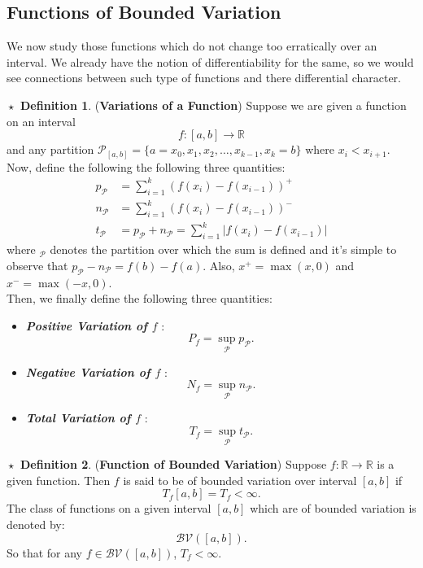 \documentclass{article}
\theoremstyle{definition}
\newtheorem{definition}{$\boxed{\star}$ Definition}
\theoremstyle{remark}
\theoremstyle{definition}
\theoremstyle{definition}
\theoremstyle{definition}
\newcommand{\abs}[1]{\left \vert #1\right \vert}
\newcommand{\R}{\mathbb{R}}
\newcommand{\bv}[1]{\mathcal{BV}\left (#1\right )}
\begin{document}
\subsection{Functions of Bounded Variation}
We now study those functions which do not change too erratically over an interval. We already have the notion of differentiability for the same, so we would see connections between such type of functions and there differential character.
\begin{definition}
	(\textbf{Variations of a Function}) Suppose we are given a function on an interval
	\[f : [a,b] \longrightarrow \R\]
	and any partition $ \mathcal{P}_{[a,b]} = \{a =x_0,x_1,x_2,\dots,x_{k-1},x_k = b\}$ where $ x_i < x_{i+1} $. Now, define the following the following three quantities:
	\begin{align*}
		p_\mathcal{P} &= \sum_{i=1}^{k} \left (f(x_i) - f(x_{i-1})\right )^{+} \\
		n_\mathcal{P} &= \sum_{i=1}^{k}\left (f(x_i) - f(x_{i-1})\right )^{-}\\
		t_\mathcal{P} &= p_{\mathcal{{P}}}+n_{\mathcal{P}} = \sum_{i=1}^{k} \abs{f(x_i) - f(x_{i-1})} 
	\end{align*} 
where $ _{\mathcal{P}} $ denotes the partition over which the sum is defined and it's simple to observe that $ p_\mathcal{P} - n_{\mathcal{P}} = f(b) - f(a)$. Also, $ x^{+} = \max(x,0) $ and $ x^{-} = \max(-x,0) $.\\
 Then, we finally define the following three quantities:
\begin{itemize}
	\item {\textbf{\emph{Positive Variation of $ f $}} : 
	\[P_f = \sup_{\mathcal{P}} p_{\mathcal{P}}.\]	
}
\item {\textbf{\emph{Negative Variation of $ f $}} :
\[N_f = \sup_{\mathcal{P}} n_{\mathcal{P}}.\]
}
\item {\textbf{\emph{Total Variation of $ f $}} : 
\[T_f = \sup_{\mathcal{P}} t_\mathcal{P}.\]
}
\end{itemize}
\end{definition}
\hrulefill
\begin{definition}
	(\textbf{Function of Bounded Variation}) Suppose $ f : \R \to \R $ is a given function. Then $ f $ is said to be of bounded variation over interval $ [a,b] $ if 
	\[T_f[a,b] = T_f < \infty.\]
	The class of functions on a given interval $ [a,b] $ which are of bounded variation is denoted by:
	\[\bv{[a,b]}.\]
	So that for any $ f\in \bv{[a,b]} $, $ T_f < \infty $.
\end{definition}
\end{document}
